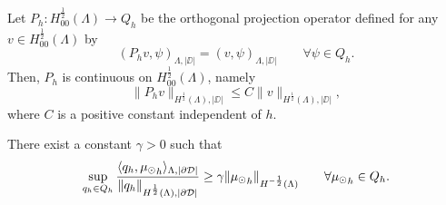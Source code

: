 
\begin{lemma}
Let $P_h: H^{\frac 12}_{00}(\Lambda) \longrightarrow Q_h$ be the orthogonal projection operator defined  for any $v \in H^{\frac 12}_{00}(\Lambda)$ by
\begin{equation*}
(P_h v , \psi)_{\Lambda,|\DD|}= (v, \psi)_{\Lambda , |\DD|} \qquad \forall \psi \in Q_h.  
\end{equation*} 
Then, $P_h$ is continuous on $H^{\frac 12}_{00}(\Lambda)$, namely
\begin{equation*}
\|P_h v\|_{H^{\frac 12}(\Lambda),|\DD|} \leq C \|v\|_{H^{\frac 12}(\Lambda),|\DD|},
\end{equation*}
where $C$ is a positive constant independent of $h$.
\end{lemma}

\begin{lemma}\label{infsup_avr_trspace}
There exist a constant $\gamma >0$ such that
\begin{equation*}
\sup_{\substack{q_h \in Q_h}} \frac{\langle q_h , {\mu_{\odot}}_h \rangle_{\Lambda, |\partial\mathcal{D}|}}{ \|q_h\|_{H^{\frac 12}(\Lambda),|\partial\mathcal{D}|}} \geq \gamma \|{\mu_{\odot}}_h\|_{H^{-\frac 12}(\Lambda)} \qquad \forall {\mu_{\odot}}_h \in Q_h.
\end{equation*} 
\end{lemma}

